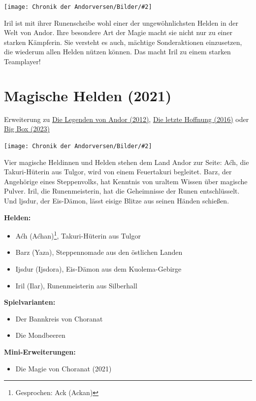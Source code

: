 \documentclass[10pt, a4paper, oneside]{book}
\newcommand{\fillbreak}{\vspace*{\fill}\columnbreak}
\newcommand{\produkt}[1]{%
    \section{#1}%
    \label{Produkt: #1}%
}
\newcommand{\refprodukt}[1]{\hyperref[Produkt: #1]{#1}}
\newcommand{\bildmitts}[2][height=0.32\textwidth,width=0.48\textwidth,keepaspectratio]{%
    \begin{center}
        \texttt{[image: Chronik der Andorversen/Bilder/\#2]}
    \end{center}
}
\begin{document}
\begin{multicols}{2}
\bildmitts{MH Promo 4.jpeg}

Iril ist mit ihrer Runenscheibe wohl einer der ungewöhnlichsten Helden in der Welt von Andor. Ihre besondere Art der Magie macht sie nicht nur zu einer starken Kämpferin. Sie versteht es auch, mächtige Sonderaktionen einzusetzen, die wiederum allen Helden nützen können. Das macht Iril zu einem starken Teamplayer!




\fillbreak
\produkt{Magische Helden (2021)}

\begin{center}
    Erweiterung zu \refprodukt{Die Legenden von Andor (2012)}, \refprodukt{Die letzte Hoffnung (2016)} oder \refprodukt{Big Box (2023)}
\end{center}

\bildmitts{Magische Helden (2021).png}

Vier magische Heldinnen und Helden stehen dem Land Andor zur Seite: Aćh, die Takuri-Hüterin aus Tulgor, wird von einem Feuertakuri begleitet. Barz, der Angehörige eines Steppenvolks, hat Kenntnis von uraltem Wissen über magische Pulver. Iril, die Runenmeisterin, hat die Geheimnisse der Runen entschlüsselt. Und ljsdur, der Eis-Dämon, lässt eisige Blitze aus seinen Händen schießen.\bigskip

\textbf{Helden:}

\begin{itemize}[topsep=0pt,itemsep=-1ex,partopsep=1ex,parsep=1ex]
    \item Aćh (Aćhan)\footnote{Gesprochen: Ack (Ackan)}, Takuri-Hüterin aus Tulgor
    \item Barz (Yaza), Steppennomade aus den östlichen Landen
    \item Ijsdur (Ijsdora), Eis-Dämon aus dem Kuolema-Gebirge
    \item Iril (Ilar), Runenmeisterin aus Silberhall
\end{itemize}

\textbf{Spielvarianten:} 

\begin{itemize}[topsep=0pt,itemsep=-1ex,partopsep=1ex,parsep=1ex]
    \item Der Bannkreis von Choranat
    \item Die Mondbeeren
\end{itemize}

\textbf{Mini-Erweiterungen:}
\begin{itemize}[topsep=0pt,itemsep=-1ex,partopsep=1ex,parsep=1ex]
    \item Die Magie von Choranat (2021)
\end{itemize}




\end{multicols}
\end{document}
